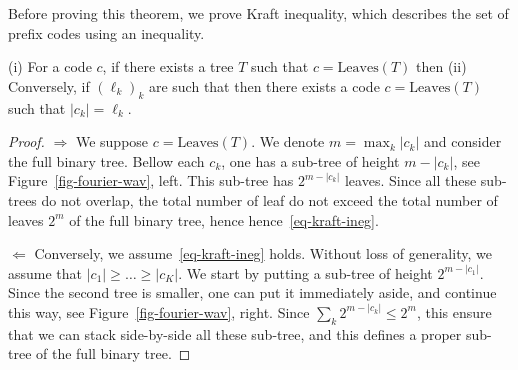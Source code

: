 Before proving this theorem, we prove Kraft inequality, which describes the set of prefix codes using an inequality.

\begin{lem}\label{lem-kraft}
	(i) For a code $c$, if there exists a tree $T$ such that $c=\text{Leaves}(T)$ then
	(ii) Conversely, if $(\ell_k)_k$ are such that
	then there exists a code $c=\text{Leaves}(T)$ such that $|c_k|=\ell_k$.
\end{lem} 

\begin{proof}
	$\Rightarrow$ We suppose $c=\text{Leaves}(T)$. We denote $m=\max_k |c_k|$ and consider the full binary tree.
	Bellow each $c_k$, one has a sub-tree of height $m-|c_k|$, see Figure~\ref{fig-fourier-wav}, left. This sub-tree has $2^{m-|c_k|}$ leaves. Since all these sub-trees do not overlap, the total number of leaf do not exceed the total number of leaves $2^m$ of the full binary tree, hence
	hence~\eqref{eq-kraft-ineg}.
	

	
	$\Leftarrow$ Conversely, we assume~\eqref{eq-kraft-ineg} holds. Without loss of generality, we assume that $|c_1| \geq \ldots \geq |c_K|$. We start by putting a sub-tree of height $2^{m-|c_1|}$. Since the second tree is smaller, one can put it immediately aside, and continue this way, see Figure~\ref{fig-fourier-wav}, right. Since  $\sum_k 2^{m-|c_k|} \leq 2^m$, this ensure that we can stack side-by-side all these sub-tree, and this defines a proper sub-tree of the full binary tree. 
\end{proof}



